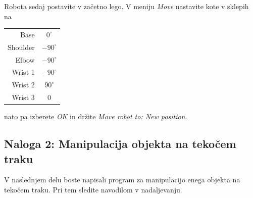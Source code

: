 Robota sedaj postavite v začetno lego.  V meniju \emph{Move} nastavite kote v sklepih na

\begin{tabular}{|r|c|}
  \hline
  Base & $0^\circ$ \\
  Shoulder & $-90^\circ$ \\
  Elbow & $-90^\circ$ \\
  Wrist 1 & $-90^\circ$ \\
  Wrist 2 & $90^\circ$ \\
  Wrist 3 & 0 \\
  \hline
\end{tabular}

nato pa izberete \emph{OK} in držite \emph{Move robot to: New position}.



\subsection{Naloga 2: Manipulacija objekta na tekočem traku}

V naslednjem delu boste napisali program za manipulacijo enega objekta na tekočem traku. Pri tem sledite navodilom v nadaljevanju.

